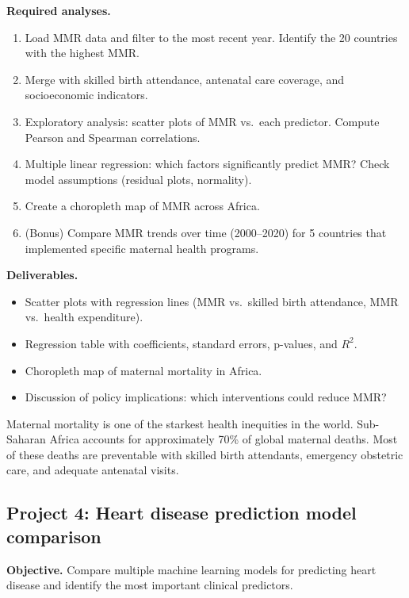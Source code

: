 \textbf{Required analyses.}
\begin{enumerate}
  \item Load MMR data and filter to the most recent year. Identify the 20 countries with the highest MMR.
  \item Merge with skilled birth attendance, antenatal care coverage, and socioeconomic indicators.
  \item Exploratory analysis: scatter plots of MMR vs.\ each predictor. Compute Pearson and Spearman correlations.
  \item Multiple linear regression: which factors significantly predict MMR? Check model assumptions (residual plots, normality).
  \item Create a choropleth map of MMR across Africa.
  \item (Bonus) Compare MMR trends over time (2000--2020) for 5 countries that implemented specific maternal health programs.
\end{enumerate}

\textbf{Deliverables.}
\begin{itemize}
  \item Scatter plots with regression lines (MMR vs.\ skilled birth attendance, MMR vs.\ health expenditure).
  \item Regression table with coefficients, standard errors, p-values, and $R^2$.
  \item Choropleth map of maternal mortality in Africa.
  \item Discussion of policy implications: which interventions could reduce MMR?
\end{itemize}

\begin{clinicalnote}
Maternal mortality is one of the starkest health inequities in the world. Sub-Saharan Africa accounts for approximately 70\% of global maternal deaths. Most of these deaths are preventable with skilled birth attendants, emergency obstetric care, and adequate antenatal visits.
\end{clinicalnote}

\subsection{Project 4: Heart disease prediction model comparison}

\textbf{Objective.} Compare multiple machine learning models for predicting heart disease and identify the most important clinical predictors.

